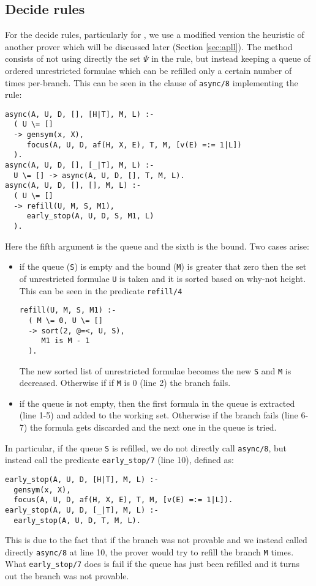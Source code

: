 \subsection{Decide rules}\label{sec:decide}
For the decide rules, particularly for \derRule{\displaydecide[2]}, we use a modified version the heuristic of another prover which will be discussed later (Section \ref{sec:apll}).
The method consists of not using directly the set $\Psi$ in the \derRule{\displaydecide[2]} rule, but instead keeping a queue of ordered unrestricted formulae which can be refilled only a certain number of times per-branch.
This can be seen in the clause of \texttt{async/8} implementing the rule:
\begin{verbatim}
async(A, U, D, [], [H|T], M, L) :-
  ( U \= [] 
  -> gensym(x, X),
     focus(A, U, D, af(H, X, E), T, M, [v(E) =:= 1|L])
  ).
async(A, U, D, [], [_|T], M, L) :-
  U \= [] -> async(A, U, D, [], T, M, L).
async(A, U, D, [], [], M, L) :-
  ( U \= [] 
  -> refill(U, M, S, M1),
     early_stop(A, U, D, S, M1, L) 
  ).
\end{verbatim}
Here the fifth argument is the queue and the sixth is the bound.
Two cases arise:
\begin{itemize}
	\item if the queue (\texttt{S}) is empty and the bound (\texttt{M}) is greater that zero then the set of unrestricted formulae \texttt{U} is taken and it is sorted based on why-not height.	
		This can be seen in the predicate \texttt{refill/4}
		\begin{verbatim}
refill(U, M, S, M1) :-
  ( M \= 0, U \= [] 
  -> sort(2, @=<, U, S), 
     M1 is M - 1
  ).
		\end{verbatim}
		The new sorted list of unrestricted formulae becomes the new \texttt{S} and \texttt{M} is decreased.
		Otherwise if if \texttt{M} is 0 (line 2) the branch fails.
	\item if the queue is not empty, then the first formula in the queue is extracted (line 1-5) and added to the working set.	%
		Otherwise if the branch fails (line 6-7) the formula gets discarded and the next one in the queue is tried.	%
\end{itemize}
In particular, if the queue \texttt{S} is refilled, we do not directly call \texttt{async/8}, but instead call the predicate \texttt{early\_stop/7} (line 10), defined as:
\begin{verbatim}
early_stop(A, U, D, [H|T], M, L) :-
  gensym(x, X),
  focus(A, U, D, af(H, X, E), T, M, [v(E) =:= 1|L]).
early_stop(A, U, D, [_|T], M, L) :-
  early_stop(A, U, D, T, M, L).
\end{verbatim}
This is due to the fact that if the branch was not provable and we instead called directly \texttt{async/8} at line 10, the prover would try to refill the branch \texttt{M} times.
What \texttt{early\_stop/7} does is fail if the queue has just been refilled and it turns out the branch was not provable.

